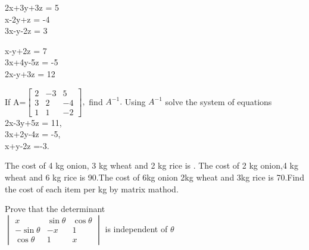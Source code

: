 \item 2x+3y+3z = 5 \\ x-2y+z = -4 \\ 3x-y-2z = 3\\
\item x-y+2z = 7 \\ 3x+4y-5z = -5 \\ 2x-y+3z = 12\\ 
\item If A=$\begin{bmatrix}
2&-3&5 \\ 3&2&-4 \\ 1&1&-2
\end{bmatrix},$ find $A^{-1}.$ Using $A^{-1}$ solve the system of equations \\
2x-3y+5z = 11, \\ 3x+2y-4z = -5, \\ x+y-2z =-3.\\
\item The cost of 4 kg onion, 3 kg wheat and 2 kg rice is . The cost of 2 kg onion,4 kg wheat and 6 kg rice is \rupee 90.The cost of 6kg onion 2kg wheat and 3kg rice is \rupee 70.Find the cost of each item per kg by matrix mathod. 
\item Prove that the determinant \\
$\begin{vmatrix}
x &\sin\theta&\cos\theta \\ -\sin\theta&-x&1 \\ \cos\theta&1&x
\end{vmatrix}$ 
is independent of $\theta$
\\
\solution 


